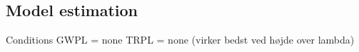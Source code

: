 \subsection{Model estimation}

Conditions
GWPL = none
TRPL = none (virker bedst ved højde over lambda)
